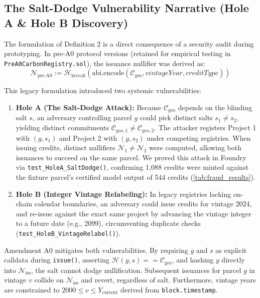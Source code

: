 \documentclass[preprint,12pt]{elsarticle}
\begin{document}
\subsection{The Salt-Dodge Vulnerability Narrative (Hole A \& Hole B Discovery)}

The formulation of Definition 2 is a direct consequence of a security audit during prototyping. In pre-A0 protocol versions (retained for empirical testing in \texttt{PreA0CarbonRegistry.sol}), the issuance nullifier was derived as:
$$\mathcal{N}_{\text{pre-A0}} := \mathcal{H}_{\text{keccak}}(\text{abi.encode}(\mathcal{C}_{\text{geo}}, vintageYear, creditType))$$

This legacy formulation introduced two systemic vulnerabilities:
\begin{enumerate}
\item \textbf{Hole A (The Salt-Dodge Attack):} Because $\mathcal{C}_{\text{geo}}$ depends on the blinding salt $s$, an adversary controlling parcel $g$ could pick distinct salts $s_1 \neq s_2$, yielding distinct commitments $\mathcal{C}_{\text{geo},1} \neq \mathcal{C}_{\text{geo},2}$. The attacker registers Project 1 with $(g, s_1)$ and Project 2 with $(g, s_2)$ under competing registries. When issuing credits, distinct nullifiers $\mathcal{N}_1 \neq \mathcal{N}_2$ were computed, allowing both issuances to succeed on the same parcel. We proved this attack in Foundry via \texttt{test\_HoleA\_SaltDodge()}, confirming 1,088 credits were minted against the fixture parcel's certified model output of 544 credits (\autoref{tab:fraud_results}).
\item \textbf{Hole B (Integer Vintage Relabeling):} In legacy registries lacking on-chain calendar boundaries, an adversary could issue credits for vintage 2024, and re-issue against the exact same project by advancing the vintage integer to a future date (e.g., 2099), circumventing duplicate checks (\texttt{test\_HoleB\_VintageRelabel()}).
\end{enumerate}

Amendment A0 mitigates both vulnerabilities. By requiring $g$ and $s$ as explicit calldata during \texttt{issue()}, asserting $\mathcal{H}(g, s) == \mathcal{C}_{\text{geo}}$, and hashing $g$ directly into $\mathcal{N}_{\text{iss}}$, the salt cannot dodge nullification. Subsequent issuances for parcel $g$ in vintage $v$ collide on $\mathcal{N}_{\text{iss}}$ and revert, regardless of salt. Furthermore, vintage years are constrained to $2000 \le v \le Y_{\text{current}}$ derived from \texttt{block.timestamp}.
\end{document}
